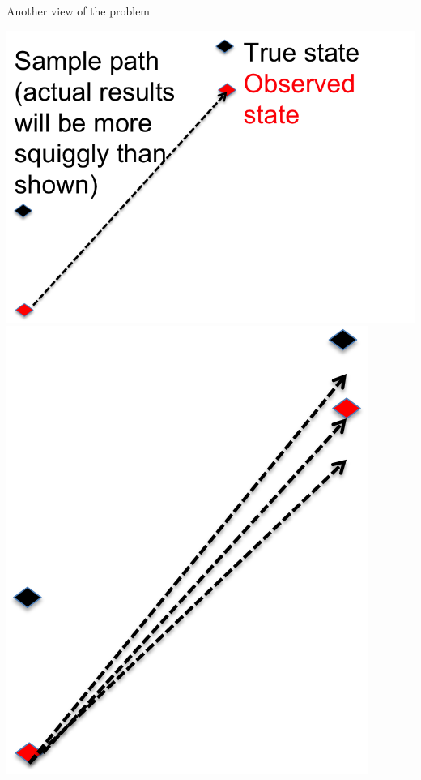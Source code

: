 \documentclass[12pt,a4paper,t,xcolor=dvipsnames,slidestop,compress,mathserif]{beamer}
\begin{document}
\begin{frame}{Another view of the problem}

\includegraphics[scale=0.3]{fwd_sampling_graphic1.png}
\pause
\phantom{0000}
\includegraphics[scale=0.3]{fwd_sampling_graphic2.png}\\
\pause

\end{frame}
\end{document}
